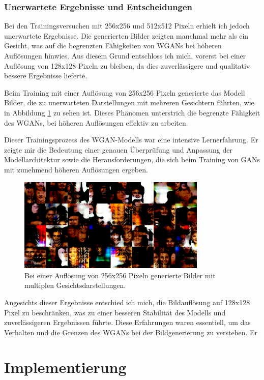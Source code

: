 \documentclass[a4paper, 12pt]{article}
\begin{document}
\subsubsection{Unerwartete Ergebnisse und Entscheidungen}
Bei den Trainingsversuchen mit 256x256 und 512x512 Pixeln erhielt ich jedoch unerwartete Ergebnisse. Die generierten Bilder zeigten manchmal mehr als ein Gesicht, was auf die begrenzten Fähigkeiten von WGANs bei höheren Auflösungen hinwies. Aus diesem Grund entschloss ich mich, vorerst bei einer Auflösung von 128x128 Pixeln zu bleiben, da dies zuverlässigere und qualitativ bessere Ergebnisse lieferte.


Beim Training mit einer Auflösung von 256x256 Pixeln generierte das Modell Bilder, die zu unerwarteten Darstellungen mit mehreren Gesichtern führten, wie in Abbildung \ref{fig:multiple_faces} zu sehen ist. Dieses Phänomen unterstrich die begrenzte Fähigkeit des WGANs, bei höheren Auflösungen effektiv zu arbeiten.

Dieser Trainingsprozess des WGAN-Modells war eine intensive Lernerfahrung. Er zeigte mir die Bedeutung einer genauen Überprüfung und Anpassung der Modellarchitektur sowie die Herausforderungen, die sich beim Training von GANs mit zunehmend höheren Auflösungen ergeben.

\begin{figure}[ht]
\centering
\includegraphics[width=0.8\textwidth]{./img/256x256.png}
\caption{Bei einer Auflösung von 256x256 Pixeln generierte Bilder mit multiplen Gesichtsdarstellungen.}
\label{fig:multiple_faces}
\end{figure}

Angesichts dieser Ergebnisse entschied ich mich, die Bildauflösung auf 128x128 Pixel zu beschränken, was zu einer besseren Stabilität des Modells und zuverlässigeren Ergebnissen führte. Diese Erfahrungen waren essentiell, um das Verhalten und die Grenzen des WGANs bei der Bildgenerierung zu verstehen.
Er

\section{Implementierung}
\end{document}
